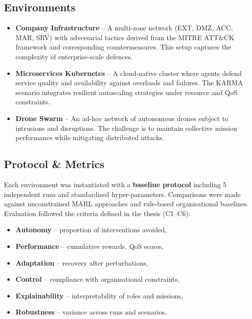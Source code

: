 \documentclass[a4paper,10pt,twocolumn]{article}
\begin{document}
\subsection{Environments}
\begin{itemize}
    \item \textbf{Company Infrastructure} – A multi-zone network
          (EXT, DMZ, ACC, MAR, SRV) with adversarial tactics derived from
          the MITRE ATT\&CK framework and corresponding countermeasures.
          This setup captures the complexity of enterprise-scale defences.

    \item \textbf{Microservices Kubernetes} – A cloud-native cluster
          where agents defend service quality and availability against
          overloads and failures. The KARMA scenario integrates resilient
          autoscaling strategies under resource and QoS constraints.

    \item \textbf{Drone Swarm} – An ad-hoc network of autonomous drones
          subject to intrusions and disruptions. The challenge is to maintain
          collective mission performance while mitigating distributed attacks.
\end{itemize}

\subsection{Protocol \& Metrics}

Each environment was instantiated with a \textbf{baseline protocol}
including 5 independent runs and standardised hyper-parameters.
Comparisons were made against unconstrained MARL approaches and
rule-based organisational baselines. Evaluation followed the criteria
defined in the thesis (C1–C6):
\begin{itemize}
    \item \textbf{Autonomy} – proportion of interventions avoided,
    \item \textbf{Performance} – cumulative rewards, QoS scores,
    \item \textbf{Adaptation} – recovery after perturbations,
    \item \textbf{Control} – compliance with organisational constraints,
    \item \textbf{Explainability} – interpretability of roles and missions,
    \item \textbf{Robustness} – variance across runs and scenarios.
\end{itemize}
\end{document}
